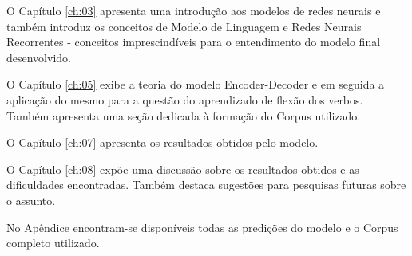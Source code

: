 O Capítulo \ref{ch:03} apresenta uma introdução aos modelos de redes neurais e também introduz os conceitos de Modelo de Linguagem e Redes Neurais Recorrentes - conceitos imprescindíveis para o entendimento do modelo final desenvolvido.

O Capítulo \ref{ch:05} exibe a teoria do modelo Encoder-Decoder e em seguida a aplicação do mesmo para a questão do aprendizado de flexão dos verbos. Também apresenta uma seção dedicada à formação do Corpus utilizado.

O Capítulo \ref{ch:07} apresenta os resultados obtidos pelo modelo.

O Capítulo \ref{ch:08} expõe uma discussão sobre os resultados obtidos e as dificuldades encontradas. Também destaca sugestões para pesquisas futuras sobre o assunto.

No Apêndice encontram-se disponíveis todas as predições do modelo e o Corpus completo utilizado.

